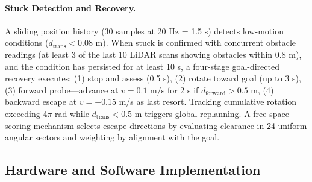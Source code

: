 \documentclass[pdflatex,sn-nature]{sn-jnl}%
\begin{document}
\paragraph{Stuck Detection and Recovery.}
A sliding position history (30 samples at 20 Hz = 1.5 s) detects low-motion conditions ($d_{\mathrm{trans}} < 0.08$ m). When stuck is confirmed with concurrent obstacle readings (at least 3 of the last 10 LiDAR scans showing obstacles within 0.8 m), and the condition has persisted for at least 10 s, a four-stage goal-directed recovery executes: (1) stop and assess (0.5 s), (2) rotate toward goal (up to 3 s), (3) forward probe—advance at $v = 0.1$ m/s for 2 s if $d_{\mathrm{forward}} > 0.5$ m, (4) backward escape at $v = -0.15$ m/s as last resort. Tracking cumulative rotation exceeding $4\pi$ rad while $d_{\mathrm{trans}} < 0.5$ m triggers global replanning. A free-space scoring mechanism selects escape directions by evaluating clearance in 24 uniform angular sectors and weighting by alignment with the goal.

\subsection{Hardware and Software Implementation}
\end{document}
